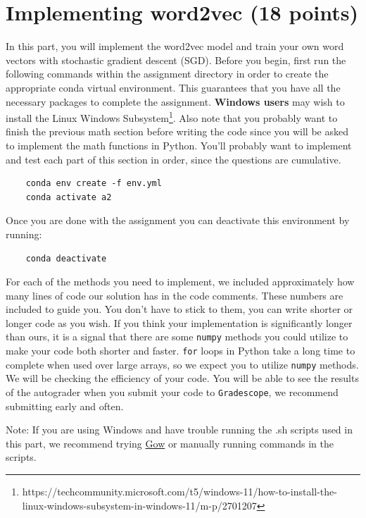 \documentclass{article}
\begin{document}
\section{Implementing word2vec (18 points)}
In this part, you will implement the word2vec model and train your own word vectors with stochastic gradient descent (SGD). Before you begin, first run the following commands within the assignment directory in order to create the appropriate conda virtual environment. This guarantees that you have all the necessary packages to complete the assignment. \textbf{Windows users} may wish to install the Linux Windows Subsystem\footnote{https://techcommunity.microsoft.com/t5/windows-11/how-to-install-the-linux-windows-subsystem-in-windows-11/m-p/2701207}. Also note that you probably want to finish the previous math section before writing the code since you will be asked to implement the math functions in Python. You’ll probably want to implement and test each part of this section in order, since the questions are cumulative.

\begin{verbatim}
    conda env create -f env.yml
    conda activate a2
\end{verbatim}

Once you are done with the assignment you can deactivate this environment by running:
\begin{verbatim}
    conda deactivate
\end{verbatim}

For each of the methods you need to implement, we included approximately how many lines of code our solution has in the code comments. These numbers are included to guide you. You don't have to stick to them, you can write shorter or longer code as you wish. If you think your implementation is significantly longer than ours, it is a signal that there are some \texttt{numpy} methods you could utilize to make your code both shorter and faster. \texttt{for} loops in Python take a long time to complete when used over large arrays, so we expect you to utilize \texttt{numpy} methods. We will be checking the efficiency of your code. You will be able to see the results of the autograder when you submit your code to \texttt{Gradescope}, we recommend submitting early and often.

Note: If you are using Windows and have trouble running the .sh scripts used in this part, we recommend trying \href{https://github.com/bmatzelle/gow}{Gow} or manually running commands in the scripts.
\end{document}
